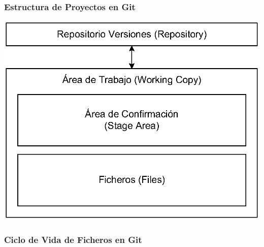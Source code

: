 \documentclass[animated,a4paper,slidestop,xcolor=pst,blue]{beamer}
\begin{document}
\begin{frame}[c]
	\frametitle{Estructura de Proyectos en Git}
	 \begin{center}
		\includegraphics[width=0.75\linewidth,keepaspectratio=true]{images/git/estructuraDirectorios.eps}
	 \end{center}
\end{frame}

\begin{frame}[t]
	\frametitle{Ciclo de Vida de Ficheros en Git}
\end{frame}
\end{document}
